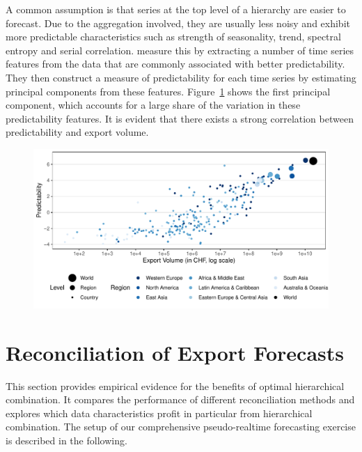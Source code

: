 \documentclass[a4paper,fleqn,11pt]{article}
\begin{document}
A common assumption is that series at the top level of a hierarchy are easier to forecast. Due to the aggregation involved, they are usually less noisy and exhibit more predictable characteristics such as strength of seasonality, trend, spectral entropy and serial correlation. \cite{Kang2017} measure this by extracting a number of time series features from the data that are commonly associated with better predictability. They then construct a measure of predictability for each time series by estimating principal components from these features. Figure~\ref{fig:feature} shows the first principal component, which accounts for a large share of the variation in these predictability features. It is evident that there exists a strong correlation between predictability and export volume.

\begin{figure}[H]
	\includegraphics[width=\textwidth]{fig/fig_confetti}
	\label{fig:feature}
\end{figure}


\section{Reconciliation of Export Forecasts}\label{sec:appl}

This section provides empirical evidence for the benefits of optimal hierarchical combination. It compares the performance of different reconciliation methods and explores which data characteristics profit in particular from hierarchical combination. The setup of our comprehensive pseudo-realtime forecasting exercise is described in the following.
\end{document}
